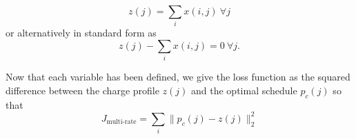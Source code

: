 \begin{equation*}
	z(j) = \sum_ix(i,j) \ \forall j	
\end{equation*}
or alternatively in standard form as 
\begin{equation*}
	z(j) - \sum_ix(i,j) = 0\ \forall j.
\end{equation*}
\par Now that each variable has been defined, we give the loss function as the squared difference between the charge profile $z(j)$ and the optimal schedule $p_c(j)$ so that
\begin{equation}
	J_{\text{multi-rate}} = \sum_i \lVert p_c(j) - z(j) \rVert_2^2
\end{equation}


